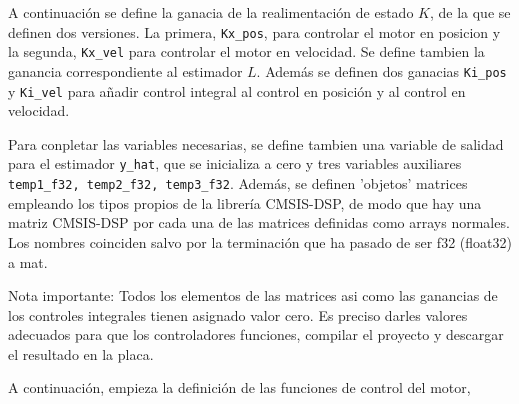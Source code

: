 A continuación se define la ganacia de la realimentación de estado $K$, de la que se definen dos versiones. La primera, \texttt{Kx\_pos}, para controlar el motor en posicion  y la segunda, \texttt{Kx\_vel} para controlar el motor en velocidad.  Se define tambien la ganancia correspondiente al estimador $L$. Además se definen dos ganacias \texttt{Ki\_pos} y \texttt{Ki\_vel} para añadir control integral al control en posición y al control en velocidad.

Para conpletar las variables necesarias, se define tambien una variable de salidad para el estimador \texttt{y\_hat}, que se inicializa a cero y tres variables auxiliares \texttt{temp1\_f32, temp2\_f32, temp3\_f32}. Además, se definen 'objetos' matrices empleando los tipos propios de la librería CMSIS-DSP, de modo que hay una matriz CMSIS-DSP por cada una de las matrices definidas como arrays normales. Los nombres coinciden salvo por la terminación que ha pasado de ser f32 (float32) a mat.

Nota importante: Todos los elementos de las matrices asi como las ganancias de los controles integrales tienen asignado valor cero. Es preciso darles valores adecuados para que los controladores funciones, compilar el proyecto y descargar el resultado en la placa.

A continuación, empieza la definición de las funciones de control del motor,
